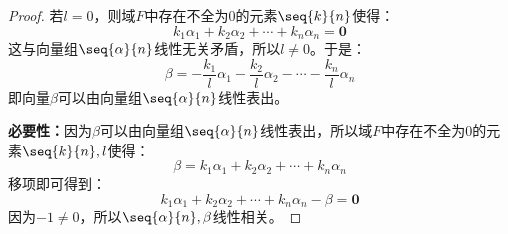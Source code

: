 \begin{proof}
	若$l=0$，则域$F$中存在不全为$0$的元素$\seq{k}{n}$使得：
	\begin{equation*}
		k_1\alpha_1+k_2\alpha_2+\cdots+k_n\alpha_n=\mathbf{0}
	\end{equation*}
	这与向量组$\seq{\alpha}{n}$线性无关矛盾，所以$l\ne0$。于是：
	\begin{equation*}
		\beta=-\frac{k_1}{l}\alpha_1-\frac{k_2}{l}\alpha_2-\cdots-\frac{k_n}{l}\alpha_n
	\end{equation*}
	即向量$\beta$可以由向量组$\seq{\alpha}{n}$线性表出。\par
	\textbf{必要性：}因为$\beta$可以由向量组$\seq{\alpha}{n}$线性表出，所以域$F$中存在不全为$0$的元素$\seq{k}{n},l$使得：
	\begin{equation*}
		\beta=k_1\alpha_1+k_2\alpha_2+\cdots+k_n\alpha_n
	\end{equation*}
	移项即可得到：
	\begin{equation*}
		k_1\alpha_1+k_2\alpha_2+\cdots+k_n\alpha_n-\beta=\mathbf{0}
	\end{equation*}
	因为$-1\ne0$，所以$\seq{\alpha}{n},\beta$线性相关。
\end{proof}
